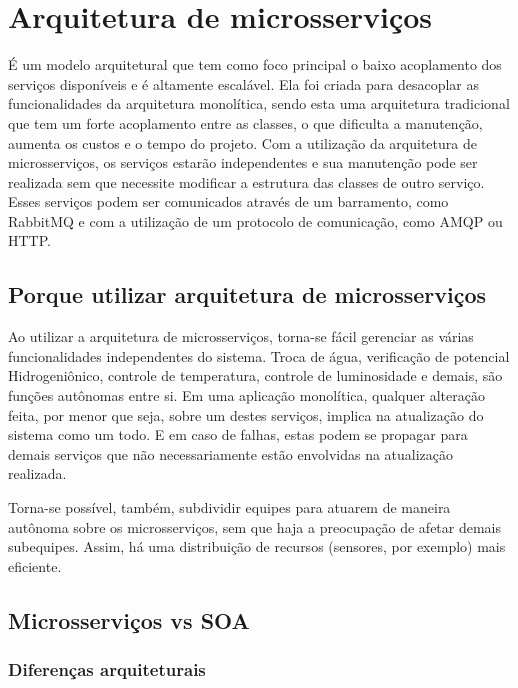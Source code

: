\section{Arquitetura de microsserviços}

É um modelo arquitetural que tem como foco principal o baixo acoplamento dos serviços disponíveis e é altamente escalável. Ela foi criada para desacoplar as funcionalidades da arquitetura monolítica, sendo esta uma arquitetura tradicional que tem um forte acoplamento entre as classes, o que dificulta a manutenção, aumenta os custos e o tempo do projeto. Com a utilização da arquitetura de microsserviços, os serviços estarão independentes e sua manutenção pode ser realizada sem que necessite modificar a estrutura das classes de outro serviço. Esses serviços podem ser comunicados através de um barramento, como RabbitMQ e com a utilização de um protocolo de comunicação, como AMQP ou HTTP. \cite{microservices} \cite{fowler}

\subsection{Porque utilizar arquitetura de microsserviços}

Ao utilizar a arquitetura de microsserviços, torna-se fácil gerenciar as várias funcionalidades independentes do sistema. Troca de água, verificação de potencial Hidrogeniônico, controle de temperatura, controle de luminosidade e demais, são funções autônomas entre si. Em uma aplicação monolítica, qualquer alteração feita, por menor que seja, sobre um destes serviços, implica na atualização do sistema como um todo. E em caso de falhas, estas podem se propagar para demais serviços que não necessariamente estão envolvidas na atualização realizada.

Torna-se possível, também, subdividir equipes para atuarem de maneira autônoma sobre os microsserviços, sem que haja a preocupação de afetar demais subequipes. Assim, há uma distribuição de recursos (sensores, por exemplo) mais eficiente.

\subsection{Microsserviços vs SOA}

\subsubsection{Diferenças arquiteturais}


